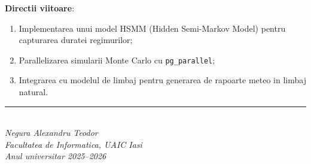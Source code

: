 \documentclass[12pt,a4paper]{article}
\begin{document}
\textbf{Directii viitoare}:
\begin{enumerate}
    \item Implementarea unui model HSMM (Hidden Semi-Markov Model) pentru capturarea duratei regimurilor;
    \item Parallelizarea simularii Monte Carlo cu \texttt{pg\_parallel};
    \item Integrarea cu modelul de limbaj pentru generarea de rapoarte meteo in limbaj natural.
\end{enumerate}

\vfill
\begin{center}
\rule{0.5\textwidth}{0.4pt}\\[0.3cm]
\textit{Negura Alexandru Teodor}\\
\textit{Facultatea de Informatica, UAIC Iasi}\\
\textit{Anul universitar 2025--2026}
\end{center}
\end{document}

